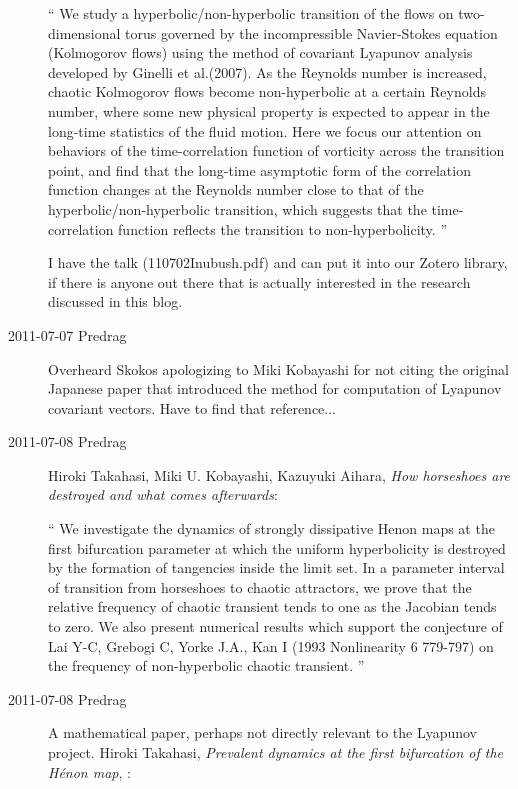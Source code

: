 \begin{description}
``
We study a hyperbolic/non-hyperbolic transition of the flows on
two-dimensional torus governed by the incompressible Navier-Stokes
equation (Kolmogorov flows) using the method of covariant Lyapunov
analysis developed by Ginelli et al.(2007). As the Reynolds number is
increased, chaotic Kolmogorov flows become non-hyperbolic at a certain
Reynolds number, where some new physical property is expected to appear
in the long-time statistics of the fluid motion. Here we focus our
attention on behaviors of the time-correlation function of vorticity
across the transition point, and find that the long-time asymptotic form
of the correlation function changes at the Reynolds number close to that
of the hyperbolic/non-hyperbolic transition, which suggests that the
time-correlation function reflects the transition to non-hyperbolicity.
''

I have the talk (110702Inubush.pdf) and can put it into our Zotero
library, if there is anyone out there that is actually interested in the
research discussed in this blog.

\item[2011-07-07 Predrag] Overheard Skokos apologizing to Miki Kobayashi
for not citing the original Japanese paper that introduced the method for
computation of Lyapunov covariant vectors. Have to find that reference...

\item[2011-07-08 Predrag]
Hiroki Takahasi, Miki U. Kobayashi, Kazuyuki Aihara,
\emph{How horseshoes are destroyed and what comes afterwards}:

``
We investigate the dynamics of strongly dissipative Henon maps at the
first bifurcation parameter at which the uniform hyperbolicity is
destroyed by the formation of tangencies inside the limit set. In a
parameter interval of transition from horseshoes to chaotic attractors,
we prove that the relative frequency of chaotic transient tends to one as
the Jacobian tends to zero. We also present numerical results which
support the conjecture of Lai Y-C, Grebogi C, Yorke J.A., Kan I (1993
Nonlinearity 6 779-797) on the frequency of non-hyperbolic chaotic
transient.
''

\item[2011-07-08 Predrag]
A mathematical paper, perhaps not directly relevant to the Lyapunov
project.
Hiroki Takahasi,
\emph{Prevalent dynamics at the first bifurcation of the H\'enon map},
:


\end{description}
